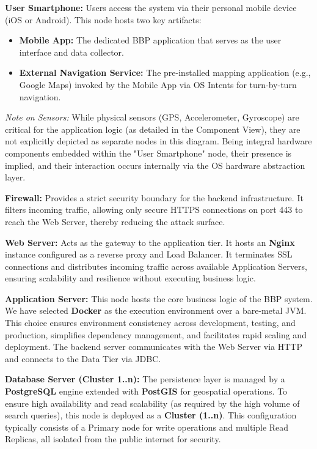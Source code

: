 \noindent \textbf{User Smartphone:} Users access the system via their personal mobile device (iOS or Android). This node hosts two key artifacts:
\begin{itemize}
    \item \textbf{Mobile App:} The dedicated BBP application that serves as the user interface and data collector.
    \item \textbf{External Navigation Service:} The pre-installed mapping application (e.g., Google Maps) invoked by the Mobile App via OS Intents for turn-by-turn navigation.
\end{itemize}
\textit{Note on Sensors:} While physical sensors (GPS, Accelerometer, Gyroscope) are critical for the application logic (as detailed in the Component View), they are not explicitly depicted as separate nodes in this diagram. Being integral hardware components embedded within the "User Smartphone" node, their presence is implied, and their interaction occurs internally via the OS hardware abstraction layer.

\vspace{0.5em}
\noindent \textbf{Firewall:} Provides a strict security boundary for the backend infrastructure. It filters incoming traffic, allowing only secure HTTPS connections on port 443 to reach the Web Server, thereby reducing the attack surface.

\vspace{0.5em}
\noindent \textbf{Web Server:} Acts as the gateway to the application tier. It hosts an \textbf{Nginx} instance configured as a reverse proxy and Load Balancer. It terminates SSL connections and distributes incoming traffic across available Application Servers, ensuring scalability and resilience without executing business logic.

\vspace{0.5em}
\noindent \textbf{Application Server:} This node hosts the core business logic of the BBP system. We have selected \textbf{Docker} as the execution environment over a bare-metal JVM. This choice ensures environment consistency across development, testing, and production, simplifies dependency management, and facilitates rapid scaling and deployment. The backend server communicates with the Web Server via HTTP and connects to the Data Tier via JDBC.

\vspace{0.5em}
\noindent \textbf{Database Server (Cluster 1..n):} The persistence layer is managed by a \textbf{PostgreSQL} engine extended with \textbf{PostGIS} for geospatial operations. To ensure high availability and read scalability (as required by the high volume of search queries), this node is deployed as a \textbf{Cluster (1..n)}. This configuration typically consists of a Primary node for write operations and multiple Read Replicas, all isolated from the public internet for security.


